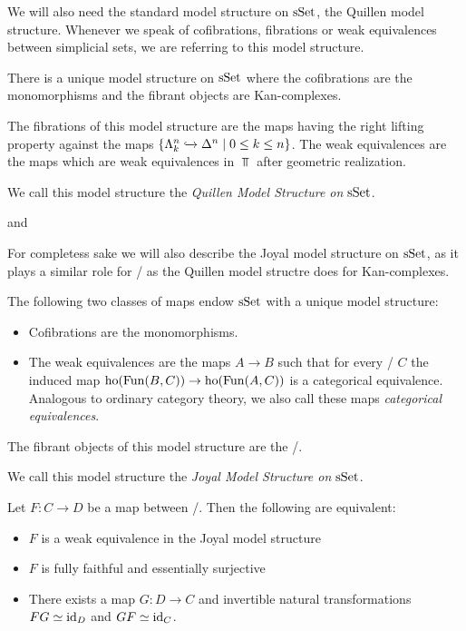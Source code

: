 We will also need the standard model structure on $\operatorname{sSet}$, the Quillen model structure. 
Whenever we speak of cofibrations, fibrations or weak equivalences between simplicial sets, we are referring to this model structure.
\begin{prop}
    There is a unique model structure on $\operatorname{sSet}$ where the cofibrations are the monomorphisms and the fibrant objects are Kan-complexes.

    The fibrations of this model structure are the maps having the right lifting property against the maps $\left\lbrace\Lambda_k^n\xhookrightarrow{}\Delta^n\mid 0\leq k\leq n\right\rbrace$.
    The weak equivalences are the maps which are weak equivalences in $\Top$ after geometric realization.

    We call this model structure the \emph{Quillen Model Structure on $\operatorname{sSet}$}.
    \begin{reference}
        \cite[Theorem 3.1.8 and Theorem 3.1.29]{cisinski_2019} and \cite[Chap. II, \S 3, Theorem 1]{Quillen1967}
    \end{reference}
\end{prop}
For completess sake we will also describe the Joyal model structure on $\operatorname{sSet}$, as it plays a similar role for \inftycats/ as the Quillen model structre does for Kan-complexes.
\begin{prop}
    The following two classes of maps endow $\operatorname{sSet}$ with a unique model structure:
    \begin{itemize}
        \item Cofibrations are the monomorphisms.
        \item The weak equivalences are the maps $A\to B$ such that for every \inftycat/ $C$ the induced map $\operatorname{ho}(\operatorname{Fun}(B,C))\to\operatorname{ho}(\operatorname{Fun}(A,C))$ is a categorical equivalence.
            Analogous to ordinary category theory, we also call these maps \emph{categorical equivalences}.
    \end{itemize}
    The fibrant objects of this model structure are the \inftycats/.

    We call this model structure the \emph{Joyal Model Structure on $\operatorname{sSet}$}.
    \begin{reference}
        \cite[Definition 3.3.7]{cisinski_2019}
    \end{reference}
\end{prop}
\begin{prop}
    Let $F\colon C\to D$ be a map between \inftycats/.
    Then the following are equivalent:
    \begin{itemize}
        \item $F$ is a weak equivalence in the Joyal model structure
        \item $F$ is fully faithful and essentially surjective
        \item There exists a map $G\colon D\to C$ and invertible natural transformations $FG\simeq \text{id}_D$ and $GF\simeq \text{id}_C$.
    \end{itemize}
    \begin{reference}
        \cite[Corollary 3.6.6 and Theorem 3.9.7]{cisinski_2019}
    \end{reference}
\end{prop}
